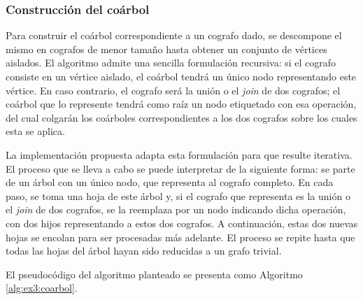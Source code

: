 
\subsubsection{Construcción del coárbol}
Para construir el coárbol correspondiente a un cografo dado, se descompone el
mismo en cografos de menor tamaño hasta obtener un conjunto de vértices
aislados. El algoritmo admite una sencilla formulación recursiva: si el
cografo consiste en un vértice aislado, el coárbol tendrá un único nodo
representando este vértice. En caso contrario, el cografo será la unión o el
\emph{join} de dos cografos; el coárbol que lo represente tendrá como raíz un
nodo etiquetado con esa operación, del cual colgarán los coárboles
correspondientes a los dos cografos sobre los cuales esta se aplica.

La implementación propuesta adapta esta formulación para que resulte
iterativa. El proceso que se lleva a cabo se puede interpretar de la siguiente
forma: se parte de un árbol con un único nodo, que representa al cografo
completo. En cada paso, se toma una hoja de este árbol y, si el cografo que
representa es la unión o el \emph{join} de dos cografos, se la reemplaza por
un nodo indicando dicha operación, con dos hijos representando a estos dos
cografos. A continuación, estas dos nuevas hojas se encolan para ser
procesadas más adelante. El proceso se repite hasta que todas las hojas del
árbol hayan sido reducidas a un grafo trivial.

El pseudocódigo del algoritmo planteado se presenta como Algoritmo
\ref{alg:ex3:coarbol}.


